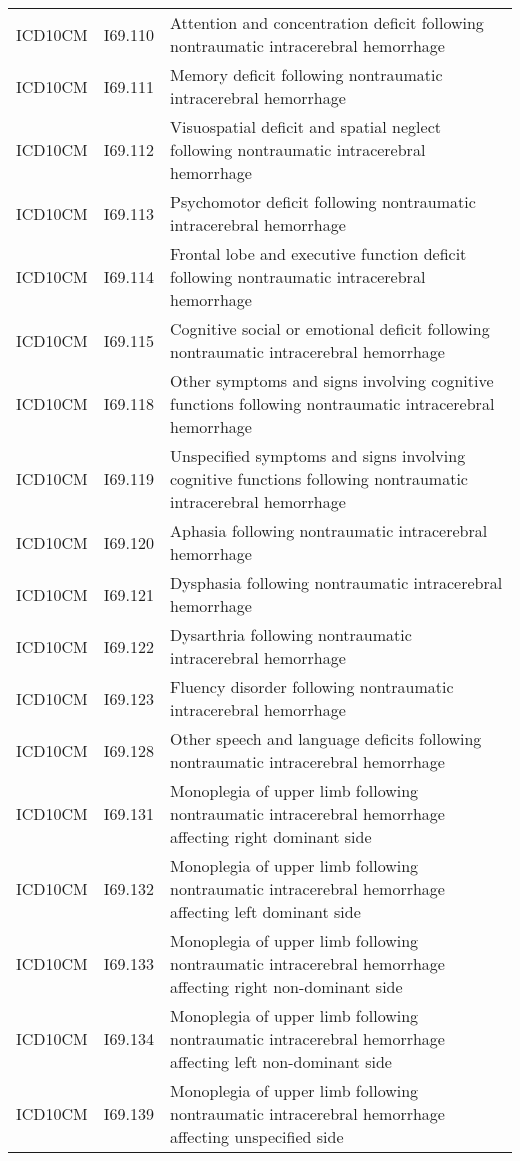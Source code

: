 \begin{longtable}{p{}p{}p{}}
  ICD10CM & I69.110 & Attention and concentration deficit following nontraumatic intracerebral hemorrhage \\ 
  ICD10CM & I69.111 & Memory deficit following nontraumatic intracerebral hemorrhage \\ 
  ICD10CM & I69.112 & Visuospatial deficit and spatial neglect following nontraumatic intracerebral hemorrhage \\ 
  ICD10CM & I69.113 & Psychomotor deficit following nontraumatic intracerebral hemorrhage \\ 
  ICD10CM & I69.114 & Frontal lobe and executive function deficit following nontraumatic intracerebral hemorrhage \\ 
  ICD10CM & I69.115 & Cognitive social or emotional deficit following nontraumatic intracerebral hemorrhage \\ 
  ICD10CM & I69.118 & Other symptoms and signs involving cognitive functions following nontraumatic intracerebral hemorrhage \\ 
  ICD10CM & I69.119 & Unspecified symptoms and signs involving cognitive functions following nontraumatic intracerebral hemorrhage \\ 
  ICD10CM & I69.120 & Aphasia following nontraumatic intracerebral hemorrhage \\ 
  ICD10CM & I69.121 & Dysphasia following nontraumatic intracerebral hemorrhage \\ 
  ICD10CM & I69.122 & Dysarthria following nontraumatic intracerebral hemorrhage \\ 
  ICD10CM & I69.123 & Fluency disorder following nontraumatic intracerebral hemorrhage \\ 
  ICD10CM & I69.128 & Other speech and language deficits following nontraumatic intracerebral hemorrhage \\ 
  ICD10CM & I69.131 & Monoplegia of upper limb following nontraumatic intracerebral hemorrhage affecting right dominant side \\ 
  ICD10CM & I69.132 & Monoplegia of upper limb following nontraumatic intracerebral hemorrhage affecting left dominant side \\ 
  ICD10CM & I69.133 & Monoplegia of upper limb following nontraumatic intracerebral hemorrhage affecting right non-dominant side \\ 
  ICD10CM & I69.134 & Monoplegia of upper limb following nontraumatic intracerebral hemorrhage affecting left non-dominant side \\ 
  ICD10CM & I69.139 & Monoplegia of upper limb following nontraumatic intracerebral hemorrhage affecting unspecified side \\ 

\end{longtable}
